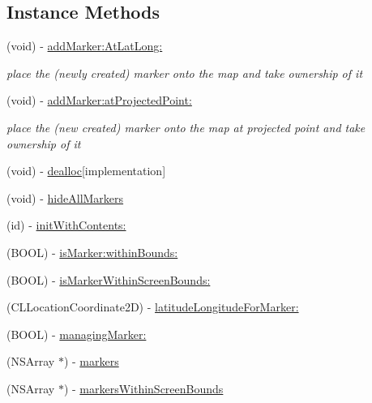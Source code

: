 \subsection*{Instance Methods}
\begin{DoxyCompactItemize}
\item 
(void) -\/ \hyperlink{interface_r_m_marker_manager_aaa93d51f42410bfa5ffe089b9382bed5}{add\-Marker\-:\-At\-Lat\-Long\-:}
\begin{DoxyCompactList}\small\item\em place the (newly created) marker onto the map and take ownership of it \end{DoxyCompactList}\item 
(void) -\/ \hyperlink{interface_r_m_marker_manager_a76651ce7b6595adb6fec4a2454e34f22}{add\-Marker\-:at\-Projected\-Point\-:}
\begin{DoxyCompactList}\small\item\em place the (new created) marker onto the map at projected point and take ownership of it \end{DoxyCompactList}\item 
(void) -\/ \hyperlink{interface_r_m_marker_manager_a73a655d4e34dced726957ed025beb79b}{dealloc}{\ttfamily  \mbox{[}implementation\mbox{]}}
\item 
(void) -\/ \hyperlink{interface_r_m_marker_manager_ad3403a9206e18ced0f63afdc17645726}{hide\-All\-Markers}
\item 
(id) -\/ \hyperlink{interface_r_m_marker_manager_a3252cf457e206e61480c30874fe12c85}{init\-With\-Contents\-:}
\item 
(B\-O\-O\-L) -\/ \hyperlink{interface_r_m_marker_manager_a3460cd9600b65d6ec7f165382a1fc3f0}{is\-Marker\-:within\-Bounds\-:}
\item 
(B\-O\-O\-L) -\/ \hyperlink{interface_r_m_marker_manager_a17a9670fc21ae2a217371cabbf7158f1}{is\-Marker\-Within\-Screen\-Bounds\-:}
\item 
(C\-L\-Location\-Coordinate2\-D) -\/ \hyperlink{interface_r_m_marker_manager_a0caec53ea1bdf295feff4d2ee67c4d85}{latitude\-Longitude\-For\-Marker\-:}
\item 
(B\-O\-O\-L) -\/ \hyperlink{interface_r_m_marker_manager_aafee5503808e606438d714ad7a1ed55b}{managing\-Marker\-:}
\item 
(N\-S\-Array $\ast$) -\/ \hyperlink{interface_r_m_marker_manager_aa8076a5e1d59a93b3a7ee21b0cae63c1}{markers}
\item 
(N\-S\-Array $\ast$) -\/ \hyperlink{interface_r_m_marker_manager_a62301c581687b080ec2d66f7d740166c}{markers\-Within\-Screen\-Bounds}

\end{DoxyCompactItemize}
